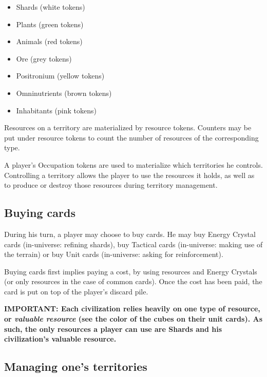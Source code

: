 \documentclass[a4paper]{article}
\begin{document}
    \vspace{-1.3em}
    \begin{itemize}
        \item Shards (white tokens)
        \item Plants (green tokens)
        \item Animals (red tokens)
        \item Ore (grey tokens)
        \item Positronium (yellow tokens)
        \item Omninutrients (brown tokens)
        \item Inhabitants (pink tokens)
    \end{itemize}
    
    \vspace{-0.7em}
    Resources on a territory are materialized by resource tokens.
    Counters may be put under resource tokens to count the number of
    resources of the corresponding type.
    
    A player's Occupation tokens are used to materialize which territories he controls.
    Controlling a territory allows the player to use the resources it holds,
    as well as to produce or destroy those resources during territory management.
  
  
  \subsection{Buying cards}

    During his turn, a player may choose to buy cards.
    He may buy Energy Crystal cards (in-universe: refining shards),
    buy Tactical cards (in-universe: making use of the terrain)
    or buy Unit cards (in-universe: asking for reinforcement).
    
    Buying cards first implies paying a cost, by using resources and Energy Crystals
    (or only resources in the case of common cards).
    Once the cost has been paid, the card is put on top of the player's discard pile.
    
    \hspace{-2em} \textbf{IMPORTANT:
    Each civilization relies heavily on one type of resource, or
    \textit{valuable resource} (see the color of the cubes on their unit cards).
    As such, the only resources a player can use are Shards and his civilization's
    valuable resource.
    }


\newpage
  \subsection{Managing one's territories}
\end{document}
